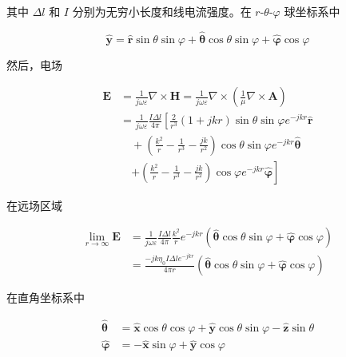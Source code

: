 \begin{TranslationNoMiniToc}
其中 $\Delta l$ 和 $I$ 分别为无穷小长度和线电流强度。在 $r$-$\theta$-$\varphi$ 球坐标系中

\begin{equation}
\boldsymbol{\hat{y}} = \boldsymbol{\hat{r}} \sin \theta \sin \varphi + \boldsymbol{\hat{\theta}} \cos \theta \sin \varphi + \boldsymbol{\hat{\varphi}} \cos \varphi
\end{equation}

然后，电场

\begin{equation}
\begin{aligned}
\boldsymbol{E} &= \frac{1}{j \omega \varepsilon} \nabla \times \boldsymbol{H} = \frac{1}{j \omega \varepsilon} \nabla \times \left( \frac{1}{\mu} \nabla \times \boldsymbol{A} \right) \\
&= \frac{1}{j \omega \varepsilon} \frac{I \Delta l}{4 \pi} \left[ \frac{2}{r^3} (1 + jkr) \sin \theta \sin \varphi e^{-jkr} \boldsymbol{\hat{r}} \right. \\
&\quad + \left( \frac{k^2}{r} - \frac{1}{r^3} - \frac{jk}{r^2} \right) \cos \theta \sin \varphi e^{-jkr} \boldsymbol{\hat{\theta}} \\
&\quad \left. + \left( \frac{k^2}{r} - \frac{1}{r^3} - \frac{jk}{r^2} \right) \cos \varphi e^{-jkr} \boldsymbol{\hat{\varphi}} \right]
\end{aligned}
\end{equation}

在远场区域

\begin{equation}
\begin{aligned}
\lim_{r \to \infty} \boldsymbol{E} &= \frac{1}{j \omega \varepsilon} \frac{I \Delta l}{4 \pi} \frac{k^2}{r} e^{-jkr} (\boldsymbol{\hat{\theta}} \cos \theta \sin \varphi + \boldsymbol{\hat{\varphi}} \cos \varphi) \\
&= \frac{-j k \eta_0 I \Delta l e^{-jkr}}{4 \pi r} (\boldsymbol{\hat{\theta}} \cos \theta \sin \varphi + \boldsymbol{\hat{\varphi}} \cos \varphi)
\end{aligned}
\end{equation}

在直角坐标系中

\begin{equation}
\begin{aligned}
\boldsymbol{\hat{\theta}} &= \boldsymbol{\hat{x}} \cos \theta \cos \varphi + \boldsymbol{\hat{y}} \cos \theta \sin \varphi - \boldsymbol{\hat{z}} \sin \theta \\
\boldsymbol{\hat{\varphi}} &= -\boldsymbol{\hat{x}} \sin \varphi + \boldsymbol{\hat{y}} \cos \varphi
\end{aligned}
\end{equation}


\end{TranslationNoMiniToc}
